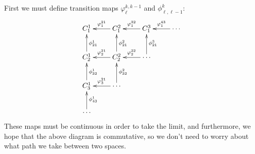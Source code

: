       First we must define transition maps $\varphi^{k,k-1}_\ell$ and $\phi^k_{\ell,\ell-1}$:
      \begin{displaymath}
        \xymatrix{
          C^1_1  & C^2_1 \ar[l]_{\varphi^{21}_1} & C^3_1 \ar[l]_{\varphi^{32}_1} & \cdots \ar[l]_{\varphi^{43}_1} \\
          C^1_2 \ar[u]_{\phi^1_{21}} & C^2_2 \ar[l]_{\varphi^{21}_2} \ar[u]_{\phi^2_{21}} & \cdots \ar[l]_{\varphi^{32}_2} \ar[u]_{\phi^3_{21}} \\
          C^1_3 \ar[u]_{\phi^1_{32}} & \cdots \ar[l]_{\varphi^{21}_3} \ar[u]_{\phi^2_{32}} \\
          \cdots \ar[u]_{\phi^1_{43}} 
        }
      \end{displaymath}
      These maps must be continuous in order to take the limit, and furthermore, we hope that the above diagram is commutative, so we don't need to worry about what path we take between two spaces.

